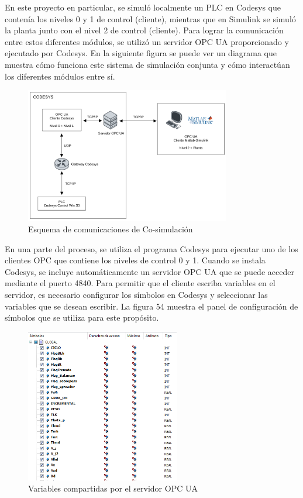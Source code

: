 \documentclass[11pt]{article}
\begin{document}
En este proyecto en particular, se simuló localmente un PLC en Codesys que contenía los niveles 0 y 1 de control (cliente), mientras que en Simulink se simuló la planta junto con el nivel 2 de control (cliente). Para lograr la comunicación entre estos diferentes módulos, se utilizó un servidor OPC UA proporcionado y ejecutado por Codesys. En la siguiente figura se puede ver un diagrama que muestra cómo funciona este sistema de simulación conjunta y cómo interactúan los diferentes módulos entre sí.

\begin{figure}[!h]
	\centering
	\includegraphics[width=0.8\textwidth]{images/co_simulacion_codesys.png}
	\caption{Esquema de comunicaciones de Co-simulación}
	\label{fig:comunicacion_servidor_opcua}
\end{figure}

En una parte del proceso, se utiliza el programa Codesys para ejecutar uno de los clientes OPC que contiene los niveles de control 0 y 1. Cuando se instala Codesys, se incluye automáticamente un servidor OPC UA que se puede acceder mediante el puerto 4840. Para permitir que el cliente escriba variables en el servidor, es necesario configurar los símbolos en Codesys y seleccionar las variables que se desean escribir. La figura 54 muestra el panel de configuración de símbolos que se utiliza para este propósito.

\begin{figure}[!h]
	\centering
	\includegraphics[width=0.6\textwidth]{images/variables_codesys.png}
	\caption{Variables compartidas por el servidor OPC UA}
	\label{fig:variables_codesys}
\end{figure}
\end{document}
